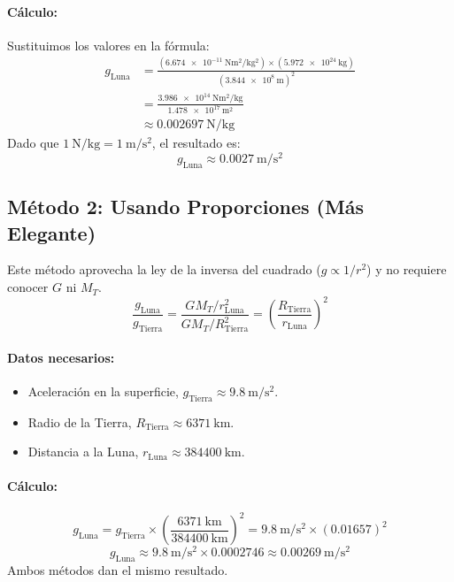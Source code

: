 \documentclass[11pt,a4paper]{book}
\begin{document}
\paragraph{Cálculo:}
Sustituimos los valores en la fórmula:
\begin{align*}
    g_{\text{Luna}} &= \frac{(\SI{6.674e-11}{\newton\meter\squared\per\kilo\gram\squared}) \times (\SI{5.972e24}{\kilo\gram})}{(\SI{3.844e8}{\meter})^2} \\
      &= \frac{\SI{3.986e14}{\newton\meter\squared\per\kilo\gram}}{\SI{1.478e17}{\meter\squared}} \\
      &\approx \SI{0.002697}{\newton\per\kilo\gram}
\end{align*}
Dado que $\SI{1}{\newton\per\kilo\gram} = \SI{1}{\meter\per\second\squared}$, el resultado es:
\[ \boxed{g_{\text{Luna}} \approx \SI{0.0027}{\meter\per\second\squared}} \]

\subsection*{Método 2: Usando Proporciones (Más Elegante)}
Este método aprovecha la ley de la inversa del cuadrado ($g \propto 1/r^2$) y no requiere conocer $G$ ni $M_T$.
\[ \frac{g_{\text{Luna}}}{g_{\text{Tierra}}} = \frac{G M_T / r_{\text{Luna}}^2}{G M_T / R_{\text{Tierra}}^2} = \left(\frac{R_{\text{Tierra}}}{r_{\text{Luna}}}\right)^2 \]

\paragraph{Datos necesarios:}
\begin{itemize}
    \item Aceleración en la superficie, $g_{\text{Tierra}} \approx \SI{9.8}{\meter\per\second\squared}$.
    \item Radio de la Tierra, $R_{\text{Tierra}} \approx \SI{6371}{\kilo\meter}$.
    \item Distancia a la Luna, $r_{\text{Luna}} \approx \SI{384400}{\kilo\meter}$.
\end{itemize}

\paragraph{Cálculo:}
\[ g_{\text{Luna}} = g_{\text{Tierra}} \times \left(\frac{\SI{6371}{\kilo\meter}}{\SI{384400}{\kilo\meter}}\right)^2 = \SI{9.8}{\meter\per\second\squared} \times (\num{0.01657})^2 \]
\[ g_{\text{Luna}} \approx \SI{9.8}{\meter\per\second\squared} \times \num{0.0002746} \approx \SI{0.00269}{\meter\per\second\squared} \]
Ambos métodos dan el mismo resultado.
\end{document}
